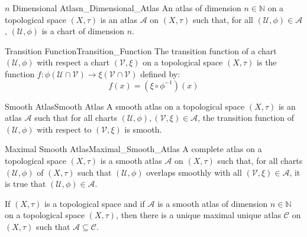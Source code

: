     \begin{ldefinition}{$n$ Dimensional Atlas}{n_Dimensional_Atlas}
        An atlas of dimension $n\in\mathbb{N}$ on a topological space
        $(X,\tau)$ is an atlas $\mathcal{A}$ on $(X,\tau)$ such that, for
        all $(\mathcal{U},\phi)\in\mathcal{A}$, $(\mathcal{U},\phi)$ is
        a chart of dimension $n$.
    \end{ldefinition}
    \begin{fdefinition}{Transition Function}{Transition_Function}
        The transition function of a chart $(\mathcal{U},\phi)$ with
        respect a chart $(\mathcal{V},\xi)$ on a topological space
        $(X,\tau)$ is the function
        $f:\phi(\mathcal{U}\cap\mathcal{V})%
         \rightarrow\xi(\mathcal{V}\cap\mathcal{V})$ defined by:
        \begin{equation}
            f(x)=(\xi\circ\phi^{\minus{1}})(x)
        \end{equation}
    \end{fdefinition}
    \begin{fdefinition}{Smooth Atlas}{Smooth Atlas}
        A smooth atlas on a topological space $(X,\tau)$ is an
        atlas $\mathcal{A}$ such that for all charts
        $(\mathcal{U},\phi),(\mathcal{V},\xi)\in\mathcal{A}$, the
        transition function of $(\mathcal{U},\phi)$ with respect to
        $(\mathcal{V},\xi)$ is smooth.
    \end{fdefinition}
    \begin{fdefinition}{Maximal Smooth Atlas}{Maximal_Smooth_Atlas}
        A complete atlas on a topological space $(X,\tau)$ is a smooth
        atlas $\mathcal{A}$ on $(X,\tau)$ such that, for all charts
        $(\mathcal{U},\phi)$ of $(X,\tau)$ such that $(\mathcal{U},\phi)$
        overlaps smoothly with all $(\mathcal{V},\xi)\in\mathcal{A}$, it
        is true that $(\mathcal{U},\phi)\in\mathcal{A}$.
    \end{fdefinition}
    \begin{theorem}
        If $(X,\tau)$ is a topological space and if $\mathcal{A}$ is a
        smooth atlas of dimension $n\in\mathbb{N}$ on a topological space
        $(X,\tau)$, then there is a unique maximal unique atlas
        $\mathcal{C}$ on $(X,\tau)$ such that
        $\mathcal{A}\subseteq\mathcal{C}$.
    \end{theorem}
